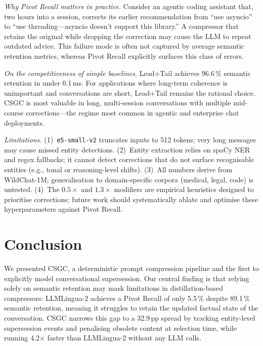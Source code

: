 \documentclass[conference]{IEEEtran}
\newcommand{\csgc}{\textsc{CSGC}}
\begin{document}
\textit{Why Pivot Recall matters in practice.}
Consider an agentic coding assistant that, two hours into a session, corrects
its earlier recommendation from ``use asyncio'' to ``use threading---asyncio
doesn't support this library.'' A compressor that retains the original while
dropping the correction may cause the LLM to repeat outdated advice.
This failure mode is often not captured by average semantic retention metrics,
whereas Pivot Recall explicitly surfaces this class of errors.

\textit{On the competitiveness of simple baselines.}
Lead+Tail achieves 96.6\,\% semantic retention in under 0.1\,ms. For
applications where long-term coherence is unimportant and conversations are
short, Lead+Tail remains the rational choice. \csgc{} is most valuable in
long, multi-session conversations with multiple mid-course corrections---the
regime most common in agentic and enterprise chat deployments.

\textit{Limitations.}
(1)~\texttt{e5-small-v2} truncates inputs to 512 tokens; very long messages
may cause missed entity detections.
(2)~Entity extraction relies on spaCy NER and regex fallbacks; it cannot
detect corrections that do not surface recognisable entities (e.g., tonal or
reasoning-level shifts).
(3)~All numbers derive from WildChat-1M; generalisation to domain-specific
corpora (medical, legal, code) is untested.
(4)~The $0.5\times$ and $1.3\times$ modifiers are empirical heuristics designed
to prioritise corrections; future work should systematically ablate and optimise
these hyperparameters against Pivot Recall.

\section{Conclusion}
\label{sec:conclusion}

We presented \csgc{}, a deterministic prompt compression pipeline and the
first to explicitly model conversational supersession. Our central finding is
that relying solely on semantic retention may mask limitations in distillation-based
compressors: LLMLingua-2 achieves a Pivot Recall of only 5.5\,\% despite
89.1\,\% semantic retention, meaning it struggles to retain the updated factual
state of the conversation. \csgc{} narrows this gap to a
32.9\,pp spread by tracking entity-level supersession events and penalising
obsolete content at selection time, while running 4.2$\times$ faster than
LLMLingua-2 without any LLM calls.
\end{document}
